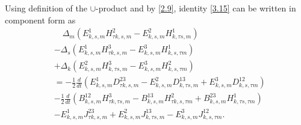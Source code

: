 \documentclass[english]{article}
\theoremstyle{plain}
\theoremstyle{definition}
\theoremstyle{remark}
\numberwithin{equation}{section}
\begin{document}
Using  definition of the $\cup$-product and by \eqref{2.9},  identity \eqref{3.15} can be written in component form as
\begin{align*}\label{}
&\quad\Delta_m(E^1_{k,s,m}H^2_{\tau k,s,m}-E^2_{k,s,m}H^1_{k,\tau s,m})\\
&-\Delta_s(E^1_{k,s,m}H^3_{\tau k,s,m}-E^3_{k,s,m}H^1_{k,s, \tau m}) \\
&+\Delta_k(E^2_{k,s,m}H^3_{k,\tau s,m}-E^3_{k,s,m}H^2_{k,s,\tau m})\\
&=-\frac{1}{2}\frac{d}{dt}(E^1_{k,s,m}D^{23}_{\tau k,s,m}-E^2_{k,s,m}D^{13}_{k,\tau s,m}+E^3_{k,s,m}D^{12}_{k,s,\tau m})\\
&-\frac{1}{2}\frac{d}{dt}(B^{12}_{k,s,m}H^3_{\tau k, \tau s,m}-B^{13}_{k,s,m}H^2_{\tau k, s,\tau m}+B^{23}_{k,s,m}H^1_{k, \tau s,\tau m})\\
&-E^1_{k,s,m}J^{23}_{\tau k,s,m}+E^2_{k,s,m}J^{13}_{k,\tau s,m}-E^3_{k,s,m}J^{12}_{k,s,\tau m}.
\end{align*}
\end{document}
